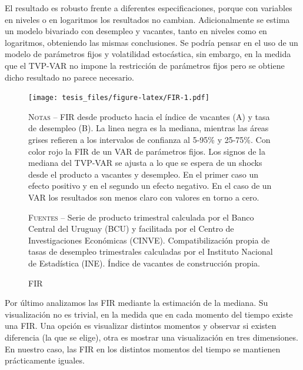 \documentclass[12pt,oneside]{reedthesis}
\begin{document}
El resultado es robusto frente a diferentes especificaciones, porque con variables en niveles o en logaritmos los resultados no cambian. Adicionalmente se estima un modelo bivariado con desempleo y vacantes, tanto en niveles como en logaritmos, obteniendo las mismas conclusiones. Se podría pensar en el uso de un modelo de parámetros fijos y volatilidad estocástica, sin embargo, en la medida que el TVP-VAR no impone la restricción de parámetros fijos pero se obtiene dicho resultado no parece necesario.
\begin{figure}
\texttt{[image: tesis\_files/figure-latex/FIR-1.pdf]}
\caption{FIR}\label{fig:FIR}\textsc{}

\footnotesize\textsc{Notas} -- FIR desde producto hacia el índice de vacantes (A) y tasa de desempleo (B). La linea negra es la mediana, mientras las áreas grises refieren a los intervalos de confianza al 5-95\% y 25-75\%. Con color rojo la FIR de un VAR de parámetros fijos. Los signos de la mediana del TVP-VAR se ajusta a lo que se espera de un shocks desde el producto a vacantes y desempleo. En el primer caso un efecto positivo y en el segundo un efecto negativo. En el caso de un VAR los resultados son menos claro con valores en torno a cero.

\textsc{Fuentes} -- Serie de producto trimestral calculada por el Banco Central del Uruguay (BCU) y facilitada por el Centro de Investigaciones Económicas (CINVE). Compatibilización propia de tasas de desempleo trimestrales calculadas por el Instituto Nacional de Estadística (INE). Índice de vacantes de construcción propia.
\end{figure}
Por último analizamos las FIR mediante la estimación de la mediana. Su visualización no es trivial, en la medida que en cada momento del tiempo existe una FIR. Una opción es visualizar distintos momentos y observar si existen diferencia (la que se elige), otra es mostrar una visualización en tres dimensiones. En nuestro caso, las FIR en los distintos momentos del tiempo se mantienen prácticamente iguales.
\end{document}
